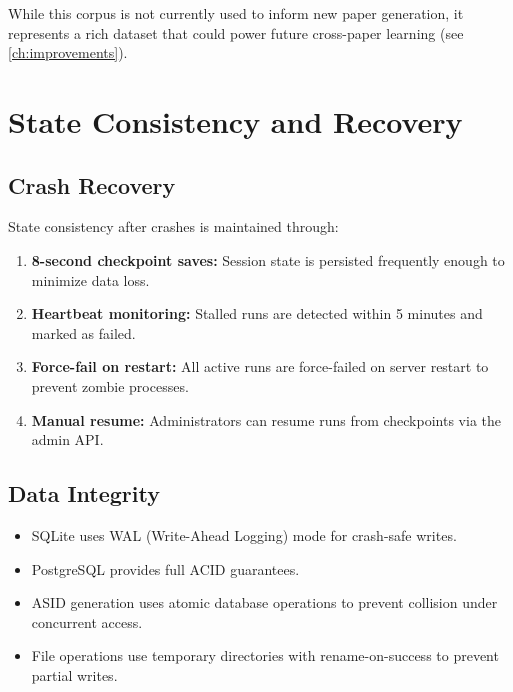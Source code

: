 While this corpus is not currently used to inform new paper generation, it represents a rich dataset that could power future cross-paper learning (see \cref{ch:improvements}).

\section{State Consistency and Recovery}
\label{sec:memory:consistency}

\subsection{Crash Recovery}

State consistency after crashes is maintained through:

\begin{enumerate}
  \item \textbf{8-second checkpoint saves:} Session state is persisted frequently enough to minimize data loss.
  \item \textbf{Heartbeat monitoring:} Stalled runs are detected within 5 minutes and marked as failed.
  \item \textbf{Force-fail on restart:} All active runs are force-failed on server restart to prevent zombie processes.
  \item \textbf{Manual resume:} Administrators can resume runs from checkpoints via the admin API.
\end{enumerate}

\subsection{Data Integrity}

\begin{itemize}
  \item SQLite uses WAL (Write-Ahead Logging) mode for crash-safe writes.
  \item PostgreSQL provides full ACID guarantees.
  \item ASID generation uses atomic database operations to prevent collision under concurrent access.
  \item File operations use temporary directories with rename-on-success to prevent partial writes.
\end{itemize}
